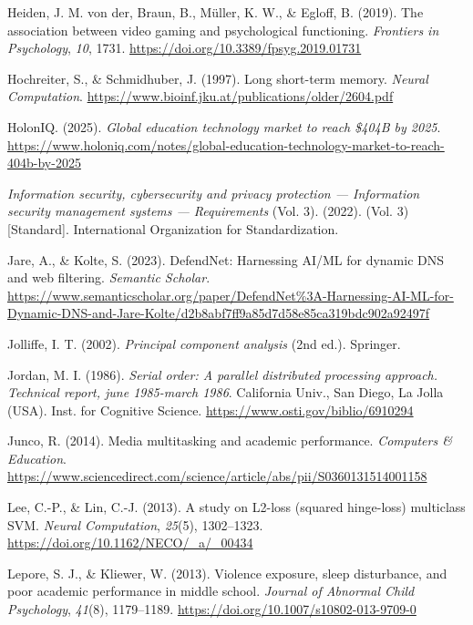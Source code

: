 \documentclass[
  titlepage]{article}
\newlength{\cslhangindent}
\newenvironment{CSLReferences}[2] %
 {\begin{list}{}{%
  \setlength{\itemindent}{0pt}
  \setlength{\leftmargin}{0pt}
  \setlength{\parsep}{0pt}
  \ifodd #1
   \setlength{\leftmargin}{\cslhangindent}
   \setlength{\itemindent}{-1\cslhangindent}
  \fi
  \setlength{\itemsep}{#2\baselineskip}}}
 {\end{list}}
\begin{document}
\begin{CSLReferences}{1}{0}
Heiden, J. M. von der, Braun, B., Müller, K. W., \& Egloff, B. (2019).
The association between video gaming and psychological functioning.
\emph{Frontiers in Psychology}, \emph{10}, 1731.
\url{https://doi.org/10.3389/fpsyg.2019.01731}

Hochreiter, S., \& Schmidhuber, J. (1997). Long short-term memory.
\emph{Neural Computation}.
\url{https://www.bioinf.jku.at/publications/older/2604.pdf}

HolonIQ. (2025). \emph{Global education technology market to reach
\$404B by 2025}.
\url{https://www.holoniq.com/notes/global-education-technology-market-to-reach-404b-by-2025}

\emph{{Information security, cybersecurity and privacy protection ---
Information security management systems --- Requirements}} (Vol. 3).
(2022). (Vol. 3) {[}Standard{]}. International Organization for
Standardization.

Jare, A., \& Kolte, S. (2023). DefendNet: Harnessing AI/ML for dynamic
DNS and web filtering. \emph{Semantic Scholar}.
\url{https://www.semanticscholar.org/paper/DefendNet\%3A-Harnessing-AI-ML-for-Dynamic-DNS-and-Jare-Kolte/d2b8abf7ff9a85d7d58e85ca319bdc902a92497f}

Jolliffe, I. T. (2002). \emph{Principal component analysis} (2nd ed.).
Springer.

Jordan, M. I. (1986). \emph{Serial order: A parallel distributed
processing approach. Technical report, june 1985-march 1986}. California
Univ., San Diego, La Jolla (USA). Inst. for Cognitive Science.
\url{https://www.osti.gov/biblio/6910294}

Junco, R. (2014). Media multitasking and academic performance.
\emph{Computers \& Education}.
\url{https://www.sciencedirect.com/science/article/abs/pii/S0360131514001158}

Lee, C.-P., \& Lin, C.-J. (2013). A study on L2-loss (squared
hinge-loss) multiclass SVM. \emph{Neural Computation}, \emph{25}(5),
1302--1323. \url{https://doi.org/10.1162/NECO/_a/_00434}

Lepore, S. J., \& Kliewer, W. (2013). Violence exposure, sleep
disturbance, and poor academic performance in middle school.
\emph{Journal of Abnormal Child Psychology}, \emph{41}(8), 1179--1189.
\url{https://doi.org/10.1007/s10802-013-9709-0}


\end{CSLReferences}
\end{document}
